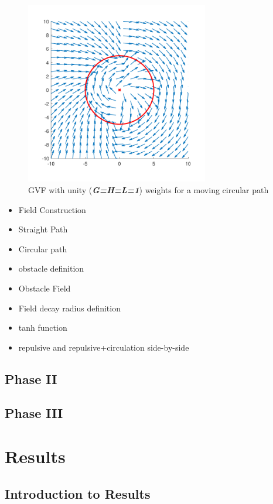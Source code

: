 \documentclass[numbered,pdftex]{ohio-etd}
\begin{document}
\begin{figure}
	\centering
	\includegraphics[width=8cm]{PaperFigures/compWithoutTitles/circConvCircTv}
	\caption{GVF with unity (\textit{\textbf{G=H=L=1}}) weights for a moving circular path}
	\label{fig:circconvcirctv}
\end{figure}





\begin{itemize}
	\item Field Construction
	\item Straight Path
	\item Circular path
	\item obstacle definition
	\item Obstacle Field
	\item Field decay radius definition
	\item tanh function
	\item repulsive and repulsive+circulation side-by-side
\end{itemize}

\section{Phase II}
\section{Phase III}

\chapter{Results}
\section{Introduction to Results}
\end{document}
